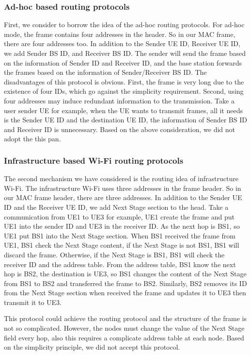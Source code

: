 \subsubsection{Ad-hoc based routing protocols}
First, we consider to borrow the idea of the ad-hoc routing protocols. For ad-hoc mode, the frame contains four addresses in the header. So in our MAC frame, there are four addresses too. In addition to the Sender UE ID, Receiver UE ID, we add Sender BS ID, and Receiver BS ID. The sender will send the frame based on the information of Sender ID and Receiver ID, and the base station forwards the frames based on the information of Sender/Receiver BS ID. The disadvantages of this protocol is obvious. First, the frame is very long due to the existence of four IDs, which go against the simplicity requirement. Second, using four addresses may induce redundant information to the transmission. Take a user sender UE for example, when the UE wants to transmit frames, all it needs is the Sender UE ID and the destination UE ID, the information of Sender BS ID and Receiver ID is unnecessary. Based on the above consideration, we did not adopt the this pan.


\subsubsection{Infrastructure based Wi-Fi routing protocols}

The second mechanism we have considered is the routing idea of infrastructure Wi-Fi. The infrastructure Wi-Fi uses three addresses in the frame header. So in our MAC frame header, there are three addresses. In addition to the Sender UE ID and the Receiver UE ID, we add Next Stage section to the head. Take a communication from UE1 to UE3 for example, UE1 create the frame and put UE1 into the sender ID and UE3 in the receiver ID. As the next hop is BS1, so UE1 put BS1 into the Next Stage section. When BS1 received the frame from UE1, BS1 check the Next Stage content, if the Next Stage is not BS1, BS1 will discard the frame. Otherwise, if the Next Stage is BS1, BS1 will check the receiver ID and the address table. From the address table, BS1 know the next hop is BS2, the destination is UE3, so BS1 changes the content of the Next Stage from BS1 to BS2 and transferred the frame to BS2. Similarly, BS2 removes its ID from the Next Stage section when received the frame and updates it to UE3 then transmit it to UE3. 

This protocol could achieve the routing protocol and the structure of the frame is not so complicated. However, the nodes must change the value of the Next Stage field every hop, also this requires a complicate address table at each node. Based on the simplicity principle, we did not accept this protocol.



